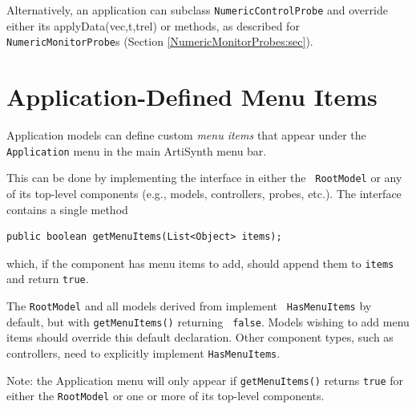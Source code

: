 Alternatively, an application can subclass {\tt NumericControlProbe}
and override either its %
{applyData(vec,t,trel)} or 
methods, as described for {\tt NumericMonitorProbe}s (Section
\ref{NumericMonitorProbes:sec}).

\section{Application-Defined Menu Items}
\label{MenuItems:sec}

Application models can define custom {\it menu items} that appear
under the {\tt Application} menu in the main ArtiSynth menu bar.

This can be done by implementing the interface
 in either the {\tt
RootModel} or any of its top-level components (e.g., models,
controllers, probes, etc.). The interface contains a single
method
%
\begin{lstlisting}[]
   public boolean getMenuItems(List<Object> items);
\end{lstlisting}
%
which, if the component has menu items to add, should append them
to {\tt items} and return {\tt true}.

The {\tt RootModel} and all models derived from
 implement {\tt
HasMenuItems} by default, but with {\tt getMenuItems()} returning {\tt
false}. Models wishing to add menu items should override this default
declaration. Other component types, such as controllers, need to
explicitly implement {\tt HasMenuItems}.

\begin{sideblock}
Note: the {\sf Application} menu will only appear if {\tt getMenuItems()} returns
{\tt true} for either the {\tt RootModel} or one or more of its
top-level components.
\end{sideblock}

